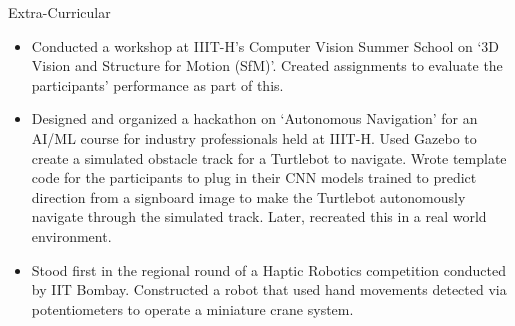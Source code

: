 \documentclass{resume}
\begin{document}
\begin{rSection}{Extra-Curricular}
\begin{itemize}
    \item Conducted a workshop at IIIT-H's Computer Vision Summer School on `3D Vision and Structure for Motion (SfM)'. Created assignments to evaluate the participants' performance as part of this.
    \item Designed and organized a hackathon on `Autonomous Navigation' for an AI/ML course for industry professionals held at IIIT-H. Used Gazebo to create a simulated obstacle track for a Turtlebot to navigate. Wrote template code for the participants to plug in their CNN models trained to predict direction from a signboard image to make the Turtlebot autonomously navigate through the simulated track. Later, recreated this in a real world environment.
    \item Stood first in the regional round of a Haptic Robotics competition conducted by IIT Bombay. Constructed a robot that used hand movements detected via potentiometers to operate a miniature crane system.
\end{itemize}
\end{rSection}
\end{document}
